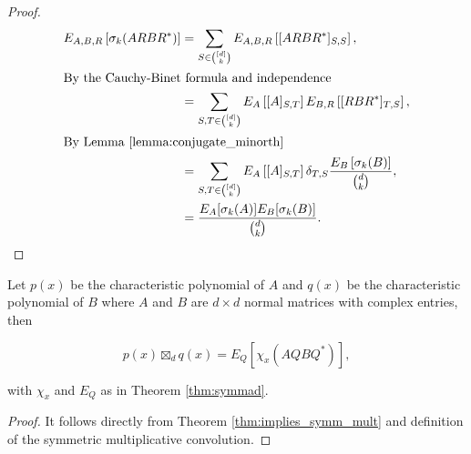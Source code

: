 \begin{proof}
    \begin{align*}
        E_{A,B,R} \left[\sigma_k(ARBR^*)\right] &= \sum_{S \in \binom{[d]}{k}} E_{A,B,R} \left[[ARBR^*]_{S,S}\right],\\ 
        \intertext{By the Cauchy-Binet formula and independence}
        &= \sum_{S,T \in \binom{[d]}{k}} E_A\left[ [A]_{S,T} \right] E_{B,R} \left[ [RBR^*]_{T,S} \right],\\ 
        \intertext{By Lemma \ref{lemma:conjugate_minorth}}
        &= \sum_{S,T \in \binom{[d]}{k}} E_A\left[[A]_{S,T} \right] \delta_{T,S}\frac{E_B\left[ \sigma_k(B)\right]}{\binom{d}{k}},\\
        &= \frac{E_A[\sigma_k(A)]E_B[\sigma_k(B)]}{\binom{d}{k}}.
    \end{align*}
\end{proof}


\begin{theorem}
    Let $p(x)$ be the characteristic polynomial of $A$ and $q(x)$ be the characteristic polynomial of $B$ where $A$ and $B$ are $d\times d$ normal matrices with complex entries, then 

    \begin{equation*}
        p(x) \boxtimes_d q(x) = E_Q \left[ \chi_x (AQBQ^*) \right],
    \end{equation*}

    \noindent with $\chi_x$ and $E_Q$ as in Theorem \ref{thm:symmad}.
\end{theorem}

\begin{proof}
    It follows directly from Theorem \ref{thm:implies_symm_mult} and definition of the symmetric multiplicative convolution.
\end{proof}